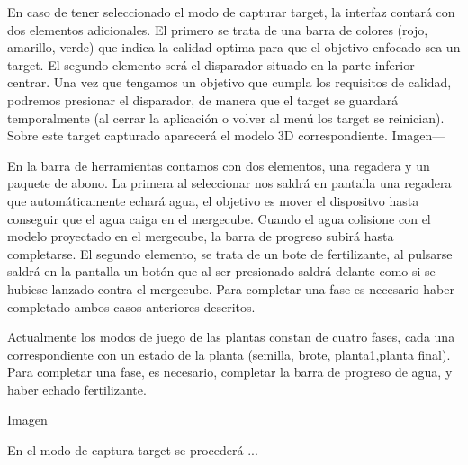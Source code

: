 
En caso de tener seleccionado el modo de capturar target, la interfaz contará con dos elementos adicionales. El primero se trata de una barra de colores (rojo, amarillo, verde) que indica la calidad optima para que el objetivo enfocado sea un target. El segundo elemento será el disparador situado en la parte inferior centrar. Una vez que tengamos un objetivo que cumpla los requisitos de calidad, podremos presionar el disparador, de manera que el target se guardará temporalmente (al cerrar la aplicación o volver al menú los target se reinician). Sobre este target capturado aparecerá el modelo 3D correspondiente. Imagen---

En la barra de herramientas contamos con dos elementos, una regadera y un paquete de abono. La primera al seleccionar nos saldrá en pantalla una regadera que automáticamente echará agua, el objetivo es mover el dispositvo hasta conseguir que el agua caiga en el mergecube. Cuando el agua colisione con el modelo proyectado en el mergecube, la barra de progreso subirá hasta completarse. 
El segundo elemento, se trata de un bote de fertilizante, al pulsarse saldrá en la pantalla un botón que al ser presionado saldrá delante como si se hubiese lanzado contra el mergecube.
Para completar una fase es necesario haber completado ambos casos anteriores descritos.

Actualmente los modos de juego de las plantas constan de cuatro fases, cada una correspondiente con un estado de la planta (semilla, brote, planta1,planta final). Para completar una fase, es necesario, completar la barra de progreso de agua, y haber echado fertilizante.

Imagen


En el modo de captura target se procederá ...


 

